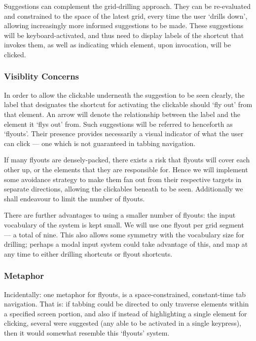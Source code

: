 \documentclass[11pt,openright,a4paper]{report}
\begin{document}
Suggestions can complement the grid-drilling approach. They can be re-evaluated and constrained to the space of the latest grid, every time the user `drills down', allowing increasingly more informed suggestions to be made. These suggestions will be keyboard-activated, and thus need to display labels of the shortcut that invokes them, as well as indicating which element, upon invocation, will be clicked.

\subsubsection{Visiblity Concerns}
In order to allow the clickable underneath the suggestion to be seen clearly, the label that designates the shortcut for activating the clickable should `fly out' from that element. An arrow will denote the relationship between the label and the element it `flys out' from. Such suggestions will be referred to henceforth as `flyouts'. Their presence provides necessarily a visual indicator of what the user can click --- one which is not guaranteed in tabbing navigation.

If many flyouts are densely-packed, there exists a risk that flyouts will cover each other up, or the elements that they are responsible for. Hence we will implement some avoidance strategy to make them fan out from their respective targets in separate directions, allowing the clickables beneath to be seen. Additionally we shall endeavour to limit the number of flyouts.

There are further advantages to using a smaller number of flyouts: the input vocabulary of the system is kept small. We will use one flyout per grid segment --- a total of nine. This also allows some symmetry with the vocabulary size for drilling; perhaps a modal input system could take advantage of this, and map at any time to either drilling shortcuts or flyout shortcuts.

\subsubsection{Metaphor}
Incidentally: one metaphor for flyouts, is a space-constrained, constant-time tab navigation. That is: if tabbing could be directed to only traverse elements within a specified screen portion, and also if instead of highlighting a single element for clicking, several were suggested (any able to be activated in a single keypress), then it would somewhat resemble this `flyouts' system.
\end{document}
